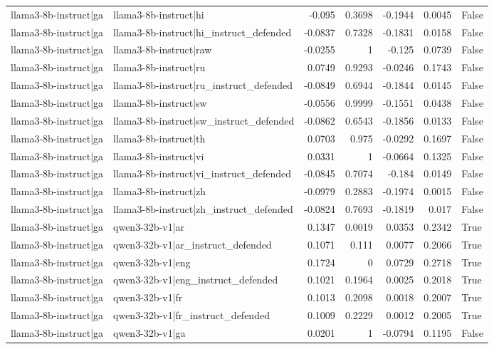 \begin{table}
\begin{tabular}{l l r r r r l}
llama3-8b-instruct|ga & llama3-8b-instruct|hi & -0.095 & 0.3698 & -0.1944 & 0.0045 & False \\
llama3-8b-instruct|ga & llama3-8b-instruct|hi_instruct_defended & -0.0837 & 0.7328 & -0.1831 & 0.0158 & False \\
llama3-8b-instruct|ga & llama3-8b-instruct|raw & -0.0255 & 1 & -0.125 & 0.0739 & False \\
llama3-8b-instruct|ga & llama3-8b-instruct|ru & 0.0749 & 0.9293 & -0.0246 & 0.1743 & False \\
llama3-8b-instruct|ga & llama3-8b-instruct|ru_instruct_defended & -0.0849 & 0.6944 & -0.1844 & 0.0145 & False \\
llama3-8b-instruct|ga & llama3-8b-instruct|sw & -0.0556 & 0.9999 & -0.1551 & 0.0438 & False \\
llama3-8b-instruct|ga & llama3-8b-instruct|sw_instruct_defended & -0.0862 & 0.6543 & -0.1856 & 0.0133 & False \\
llama3-8b-instruct|ga & llama3-8b-instruct|th & 0.0703 & 0.975 & -0.0292 & 0.1697 & False \\
llama3-8b-instruct|ga & llama3-8b-instruct|vi & 0.0331 & 1 & -0.0664 & 0.1325 & False \\
llama3-8b-instruct|ga & llama3-8b-instruct|vi_instruct_defended & -0.0845 & 0.7074 & -0.184 & 0.0149 & False \\
llama3-8b-instruct|ga & llama3-8b-instruct|zh & -0.0979 & 0.2883 & -0.1974 & 0.0015 & False \\
llama3-8b-instruct|ga & llama3-8b-instruct|zh_instruct_defended & -0.0824 & 0.7693 & -0.1819 & 0.017 & False \\
llama3-8b-instruct|ga & qwen3-32b-v1|ar & 0.1347 & 0.0019 & 0.0353 & 0.2342 & True \\
llama3-8b-instruct|ga & qwen3-32b-v1|ar_instruct_defended & 0.1071 & 0.111 & 0.0077 & 0.2066 & True \\
llama3-8b-instruct|ga & qwen3-32b-v1|eng & 0.1724 & 0 & 0.0729 & 0.2718 & True \\
llama3-8b-instruct|ga & qwen3-32b-v1|eng_instruct_defended & 0.1021 & 0.1964 & 0.0025 & 0.2018 & True \\
llama3-8b-instruct|ga & qwen3-32b-v1|fr & 0.1013 & 0.2098 & 0.0018 & 0.2007 & True \\
llama3-8b-instruct|ga & qwen3-32b-v1|fr_instruct_defended & 0.1009 & 0.2229 & 0.0012 & 0.2005 & True \\
llama3-8b-instruct|ga & qwen3-32b-v1|ga & 0.0201 & 1 & -0.0794 & 0.1195 & False \\

\end{tabular}
\end{table}
